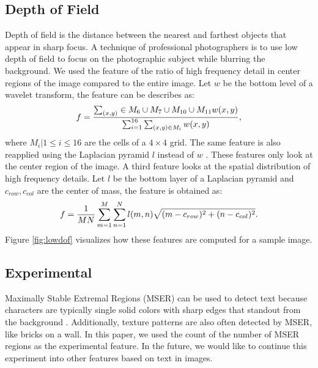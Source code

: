 \documentclass[conference,a4paper]{IEEEtran}
\begin{document}
  \subsection{Depth of Field}
  Depth of field is the distance between the nearest and farthest objects that appear in sharp focus.  A technique of professional photographers is to use low depth of field to focus on the photographic subject while blurring the background.  We used the feature \cite{datta2006studying} of the ratio of high frequency detail in center regions of the image compared to the entire image.  Let $w$ be the bottom level of a wavelet transform, the feature can be describes as:
  \begin{equation}
    f ={\sum_{(x,y)}\in M_6\cup M_7\cup M_{10}\cup M_{11} w(x,y) \over \sum_{i=1}^{16}\sum_{(x,y)\in M_i} w(x,y)} ,
  \end{equation}
  where $M_i | 1 \le i \le 16$ are the cells of a $4\times4$ grid.  The same feature is also reapplied using the Laplacian pyramid $l$ instead of $w$ \cite{wang2015automatic}.  These features only look at the center region of the image.  A third feature \cite{wang2015automatic} looks at the spatial distribution of high frequency details.  Let $l$ be the bottom layer of a Laplacian pyramid and $c_{row}, c_{col}$ are the center of mass, the feature is obtained as:
  \begin{equation} 
    f = {1 \over MN} \sum_{m=1}^M\sum_{n=1}^N l(m,n)\sqrt{(m-c_{row})^2 + (n-c_{col})^2} .
  \end{equation}
  Figure \ref{fig:lowdof} visualizes how these features are computed for a sample image.

  \subsection{Experimental}
  Maximally Stable Extremal Regions (MSER) \cite{matas2004robust} can be used to detect text because characters are typically single solid colors with sharp edges that standout from the background \cite{chen2011robust}.  Additionally, texture patterns are also often detected by MSER, like bricks on a wall.  In this paper, we used the count of the number of MSER regions as the experimental feature. In the future, we would like to continue this experiment into other features based on text in images.
 
\end{document}
